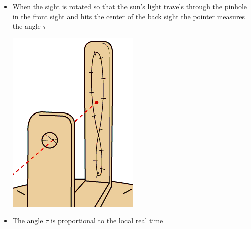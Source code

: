\documentclass[final]{beamer}
\begin{document}
\begin{frame}
\begin{columns}[t]
\begin{column}[t]{0.24 \textwidth}
\begin{itemize}
\item When the sight is rotated so that the sun's light travels
through the pinhole in the front sight and hits the center of the
back sight the pointer measures the angle $\tau$
\begin{center}
\includegraphics{dialcenter.png}
\end{center}
\item The angle $\tau$ is proportional to the local real time
\begin{center}
\end{center}
\end{itemize}





\end{column}
\end{columns}
\end{frame}
\end{document}
